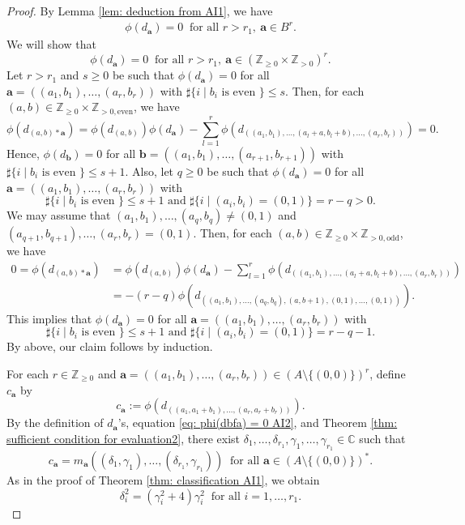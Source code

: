 \documentclass[10pt,a4paper]{amsart}
\begin{document}
\begin{proof}
  By Lemma \ref{lem: deduction from AI1}, we have
  \begin{align}\label{eq: phi(dbfa) = 0 AI2}
    \phi(d_\mathbf{a}) = 0 \ \text{ for all } r > r_1,\ \mathbf{a} \in B^r.
  \end{align}
  We will show that
  \[
    \phi(d_\mathbf{a}) = 0 \ \text{ for all } r > r_1,\ \mathbf{a} \in (\mathbb{Z}_{\geq 0} \times \mathbb{Z}_{> 0})^r.
  \]
  Let $r > r_1$ and $s \geq 0$ be such that $\phi(d_\mathbf{a}) = 0$ for all $\mathbf{a} = ((a_1,b_1),\dots,(a_r,b_r))$ with $\sharp\{i \mid \text{$b_i$ is even }\} \leq s$.
  Then, for each $(a,b) \in \mathbb{Z}_{\geq 0} \times \mathbb{Z}_{> 0,\mathrm{even}}$, we have
  \[
    \phi(d_{(a,b)*\mathbf{a}}) = \phi(d_{(a,b)}) \phi(d_\mathbf{a}) - \sum_{l=1}^r \phi(d_{((a_1,b_1),\dots,(a_l+a,b_l+b),\dots,(a_r,b_r))}) = 0.
  \]
  Hence, $\phi(d_\mathbf{b}) = 0$ for all $\mathbf{b} = ((a_1,b_1),\dots,(a_{r+1},b_{r+1}))$ with $\sharp\{i \mid \text{$b_i$ is even }\} \leq s+1$.
  Also, let $q \geq 0$ be such that $\phi(d_\mathbf{a}) = 0$ for all $\mathbf{a} = ((a_1,b_1),\dots,(a_r,b_r))$ with
  \[
    \sharp\{i \mid \text{$b_i$ is even }\} \leq s+1 \text{ and } \sharp\{ i \mid (a_i,b_i) = (0,1) \} = r-q > 0.
  \]
  We may assume that $(a_1,b_1),\dots,(a_q,b_q) \neq (0,1)$ and $(a_{q+1},b_{q+1}),\dots,(a_r,b_r) = (0,1)$.
  Then, for each $(a,b) \in \mathbb{Z}_{\geq 0} \times \mathbb{Z}_{> 0,\mathrm{odd}}$, we have
  \begin{align*}
    0 = \phi(d_{(a,b)*\mathbf{a}}) &= \phi(d_{(a,b)}) \phi(d_\mathbf{a}) - \sum_{l=1}^r \phi(d_{((a_1,b_1),\dots,(a_l+a,b_l+b),\dots,(a_r,b_r))})\\
    &= -(r-q)\phi(d_{((a_1,b_1),\dots,(a_q,b_q),(a,b+1),(0,1),\dots,(0,1))}).
  \end{align*}
  This implies that $\phi(d_\mathbf{a}) = 0$ for all $\mathbf{a} = ((a_1,b_1),\dots,(a_r,b_r))$ with
  \[
    \sharp\{i \mid \text{$b_i$ is even }\} \leq s+1 \text{ and } \sharp\{ i \mid (a_i,b_i) = (0,1) \} = r-q-1.
  \]
  By above, our claim follows by induction.

  For each $r \in \mathbb{Z}_{\geq 0}$ and $\mathbf{a} = ((a_1,b_1),\dots,(a_r,b_r)) \in (A \setminus \{(0,0)\})^r$, define $c_\mathbf{a}$ by
  \[
    c_\mathbf{a} := \phi(d_{((a_1,a_1+b_1),\dots,(a_r,a_r+b_r))}).
  \]
  By the definition of $d_{\mathbf{a}}$'s, equation \eqref{eq: phi(dbfa) = 0 AI2}, and Theorem \ref{thm: sufficient condition for evaluation2}, there exist $\delta_1,\dots,\delta_{r_1},\gamma_1,\dots,\gamma_{r_1} \in \mathbb{C}$ such that
  \[
    c_\mathbf{a} = m_\mathbf{a}((\delta_1,\gamma_1),\dots,(\delta_{r_1},\gamma_{r_1})) \ \text{ for all } \mathbf{a} \in (A \setminus \{(0,0)\})^*.
  \]
  As in the proof of Theorem \ref{thm: classification AI1}, we obtain
  \[
    \delta_i^2 = (\gamma_i^2+4)\gamma_i^2 \ \text{ for all } i = 1,\dots,r_1.
  \]


\end{proof}
\end{document}

